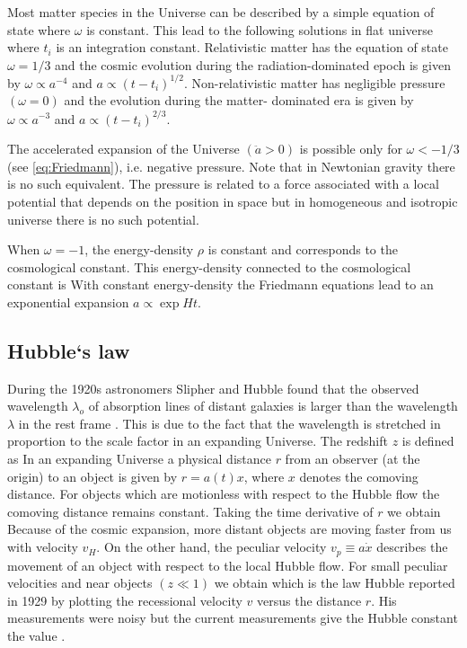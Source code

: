 Most matter species in the Universe can be described by a simple equation of state
where $\omega$ is constant. This lead to the following solutions in flat universe
where $t_i$ is an integration constant. Relativistic matter has the equation of state $\omega=1/3$ and the cosmic evolution during the radiation-dominated epoch is given by $\omega\propto a^{-4}$ and $a\propto(t-t_i)^{1/2}$. Non-relativistic matter has negligible pressure $(\omega=0)$ and the evolution during the matter- dominated era is given by $\omega\propto a^{-3}$ and $a\propto(t-t_i)^{2/3}$.

The accelerated expansion of the Universe $(\ddot a>0)$ is possible only for $\omega<-1/3$ (see \autoref{eq:Friedmann}), i.e. negative pressure. Note that in Newtonian gravity there is no such equivalent. The pressure is related to a force associated with a local potential that depends on the position in space but in homogeneous and isotropic universe there is no such potential.

When $\omega=-1$, the energy-density $\rho$ is constant and corresponds to the cosmological constant. This energy-density connected to the cosmological constant is
With constant energy-density the Friedmann equations lead to an exponential expansion $a\propto\exp{Ht}$.

\subsection{Hubble`s law}
During the 1920s astronomers Slipher and Hubble found that the observed wavelength $\lambda_o$ of absorption lines of distant galaxies is larger than the wavelength $\lambda$ in the rest frame \cite{1929PNAS...15..168H}. This is due to the fact that the wavelength is stretched in proportion to the scale factor in an expanding Universe. The redshift $z$ is defined as
In an expanding Universe a physical distance $r$ from an observer (at the origin) to an object is given by $r=a(t)x$, where $x$ denotes the comoving distance. For objects which are motionless with respect to the Hubble flow the comoving distance remains constant. Taking the time derivative of $r$ we obtain
Because of the cosmic expansion, more distant objects are moving faster from us with velocity $v_H$. On the other hand, the peculiar velocity $v_p\equiv a\dot x$ describes the movement of an object with respect to the local Hubble flow. For small peculiar velocities and near objects $(z\ll1)$ we obtain
which is the law Hubble reported in 1929 by plotting the recessional velocity $v$ versus the distance $r$. His measurements were noisy but the current measurements give the Hubble constant the value \cite{collaboration2018planck}.

